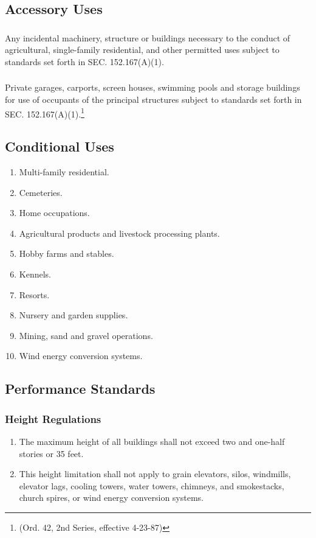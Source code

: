 \subsection{Accessory Uses}
\subsubsection{}
Any incidental machinery, structure or buildings necessary to the conduct of agricultural, single-family residential, and other permitted uses subject to standards set forth in SEC. 152.167(A)(1).
\subsubsection{}
Private garages, carports, screen houses, swimming pools and storage buildings for use of occupants of the principal structures subject to standards set forth in SEC. 152.167(A)(1).\footnote{(Ord. 42, 2nd Series, effective 4-23-87)}
\subsection{Conditional Uses}
\begin{enumerate}[{\indent}1)]
    \item Multi-family residential.
    \item Cemeteries.
    \item Home occupations.
    \item Agricultural products and livestock processing plants.
    \item Hobby farms and stables.
    \item Kennels.
    \item Resorts.
    \item Nursery and garden supplies.
    \item Mining, sand and gravel operations.
    \item Wind energy conversion systems.
\end{enumerate}
\subsection{Performance Standards}
\subsubsection{Height Regulations}
\begin{enumerate}[{\indent}a)]
    \item The maximum height of all buildings shall not exceed two and one-half stories or 35 feet.
    \item This height limitation shall not apply to grain elevators, silos, windmills, elevator lags, cooling towers, water towers, chimneys, and smokestacks, church spires, or wind energy conversion systems.
\end{enumerate}

